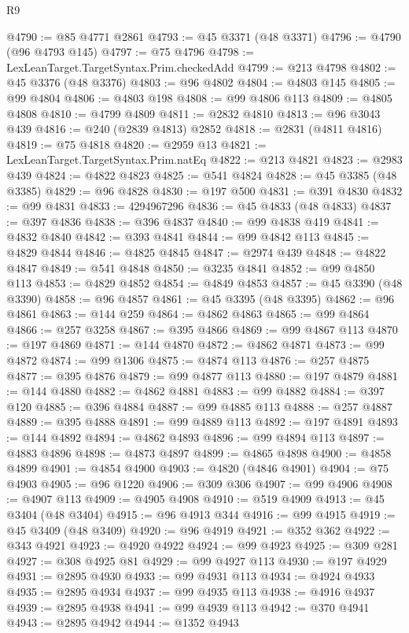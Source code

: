 \begin{lexlean}{R9}
\begin{coremodule}
@4790 := @85 @4771 @2861
@4793 := @45 @3371 (@48 @3371)
@4796 := @4790 (@96 @4793 @145)
@4797 := @75 @4796
@4798 := LexLeanTarget.TargetSyntax.Prim.checkedAdd
@4799 := @213 @4798
@4802 := @45 @3376 (@48 @3376)
@4803 := @96 @4802
@4804 := @4803 @145
@4805 := @99 @4804
@4806 := @4803 @198
@4808 := @99 @4806 @113
@4809 := @4805 @4808
@4810 := @4799 @4809
@4811 := @2832 @4810
@4813 := @96 @3043 @439
@4816 := @240 (@2839 @4813) @2852
@4818 := @2831 (@4811 @4816)
@4819 := @75 @4818
@4820 := @2959 @13
@4821 := LexLeanTarget.TargetSyntax.Prim.natEq
@4822 := @213 @4821
@4823 := @2983 @439
@4824 := @4822 @4823
@4825 := @541 @4824
@4828 := @45 @3385 (@48 @3385)
@4829 := @96 @4828
@4830 := @197 @500
@4831 := @391 @4830
@4832 := @99 @4831
@4833 := 4294967296
@4836 := @45 @4833 (@48 @4833)
@4837 := @397 @4836
@4838 := @396 @4837
@4840 := @99 @4838 @419
@4841 := @4832 @4840
@4842 := @393 @4841
@4844 := @99 @4842 @113
@4845 := @4829 @4844
@4846 := @4825 @4845
@4847 := @2974 @439
@4848 := @4822 @4847
@4849 := @541 @4848
@4850 := @3235 @4841
@4852 := @99 @4850 @113
@4853 := @4829 @4852
@4854 := @4849 @4853
@4857 := @45 @3390 (@48 @3390)
@4858 := @96 @4857
@4861 := @45 @3395 (@48 @3395)
@4862 := @96 @4861
@4863 := @144 @259
@4864 := @4862 @4863
@4865 := @99 @4864
@4866 := @257 @3258
@4867 := @395 @4866
@4869 := @99 @4867 @113
@4870 := @197 @4869
@4871 := @144 @4870
@4872 := @4862 @4871
@4873 := @99 @4872
@4874 := @99 @1306
@4875 := @4874 @113
@4876 := @257 @4875
@4877 := @395 @4876
@4879 := @99 @4877 @113
@4880 := @197 @4879
@4881 := @144 @4880
@4882 := @4862 @4881
@4883 := @99 @4882
@4884 := @397 @120
@4885 := @396 @4884
@4887 := @99 @4885 @113
@4888 := @257 @4887
@4889 := @395 @4888
@4891 := @99 @4889 @113
@4892 := @197 @4891
@4893 := @144 @4892
@4894 := @4862 @4893
@4896 := @99 @4894 @113
@4897 := @4883 @4896
@4898 := @4873 @4897
@4899 := @4865 @4898
@4900 := @4858 @4899
@4901 := @4854 @4900
@4903 := @4820 (@4846 @4901)
@4904 := @75 @4903
@4905 := @96 @1220
@4906 := @309 @306
@4907 := @99 @4906
@4908 := @4907 @113
@4909 := @4905 @4908
@4910 := @519 @4909
@4913 := @45 @3404 (@48 @3404)
@4915 := @96 @4913 @344
@4916 := @99 @4915
@4919 := @45 @3409 (@48 @3409)
@4920 := @96 @4919
@4921 := @352 @362
@4922 := @343 @4921
@4923 := @4920 @4922
@4924 := @99 @4923
@4925 := @309 @281
@4927 := @308 @4925 @81
@4929 := @99 @4927 @113
@4930 := @197 @4929
@4931 := @2895 @4930
@4933 := @99 @4931 @113
@4934 := @4924 @4933
@4935 := @2895 @4934
@4937 := @99 @4935 @113
@4938 := @4916 @4937
@4939 := @2895 @4938
@4941 := @99 @4939 @113
@4942 := @370 @4941
@4943 := @2895 @4942
@4944 := @1352 @4943

\end{coremodule}
\end{lexlean}

